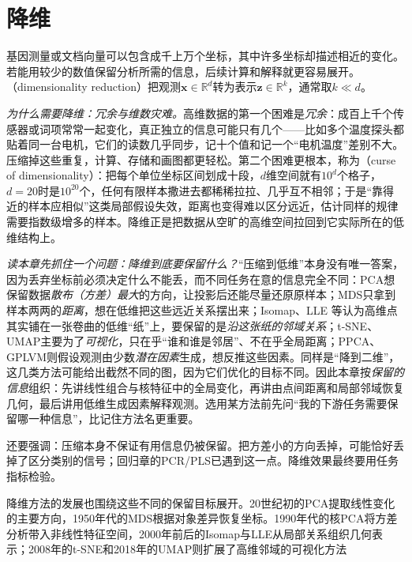 \chapter{降维}
\label{chap:dimensionality-reduction}

\begingroup
\let\dimensionalityNoteFont\booknotefont
\renewcommand{\booknotefont}{\dimensionalityNoteFont\color{black}}

基因测量或文档向量可以包含成千上万个坐标，其中许多坐标却描述相近的变化。若能用较少的数值保留分析所需的信息，后续计算和解释就更容易展开。（dimensionality reduction）把观测$\bm{x}\in\mathbb{R}^{d}$转为表示$\bm{z}\in\mathbb{R}^{k}$，通常取$k\ll d$。

\emph{为什么需要降维：冗余与维数灾难。}高维数据的第一个困难是\emph{冗余}：成百上千个传感器或词项常常一起变化，真正独立的信息可能只有几个——比如多个温度探头都贴着同一台电机，它们的读数几乎同步，记十个值和记一个“电机温度”差别不大。压缩掉这些重复，计算、存储和画图都更轻松。第二个困难更根本，称为（curse of dimensionality）：把每个单位坐标区间划成十段，$d$维空间就有$10^d$个格子，$d=20$时是$10^{20}$个，任何有限样本撒进去都稀稀拉拉、几乎互不相邻；于是“靠得近的样本应相似”这类局部假设失效，距离也变得难以区分远近，估计同样的规律需要指数级增多的样本。降维正是把数据从空旷的高维空间拉回到它实际所在的低维结构上。

\emph{读本章先抓住一个问题：降维到底要保留什么？}“压缩到低维”本身没有唯一答案，因为丢弃坐标前必须决定什么不能丢，而不同任务在意的信息完全不同：PCA想保留数据\emph{散布（方差）最大}的方向，让投影后还能尽量还原原样本；MDS只拿到样本两两的\emph{距离}，想在低维把这些远近关系摆出来；Isomap、LLE 等认为高维点其实铺在一张卷曲的低维“纸”上，要保留的是\emph{沿这张纸的邻域关系}；t-SNE、UMAP主要为了\emph{可视化}，只在乎“谁和谁是邻居”、不在乎全局距离；PPCA、GPLVM则假设观测由少数\emph{潜在因素}生成，想反推这些因素。同样是“降到二维”，这几类方法可能给出截然不同的图，因为它们优化的目标不同。因此本章按\emph{保留的信息}组织：先讲线性组合与核特征中的全局变化，再讲由点间距离和局部邻域恢复几何，最后讲用低维生成因素解释观测。选用某方法前先问“我的下游任务需要保留哪一种信息”，比记住方法名更重要。

还要强调：压缩本身不保证有用信息仍被保留。把方差小的方向丢掉，可能恰好丢掉了区分类别的信号；回归章的PCR/PLS已遇到这一点。降维效果最终要用任务指标检验。

降维方法的发展也围绕这些不同的保留目标展开。20世纪初的PCA提取线性变化的主要方向，1950年代的MDS根据对象差异恢复坐标。1990年代的核PCA将方差分析带入非线性特征空间，2000年前后的Isomap与LLE从局部关系组织几何表示；2008年的t-SNE和2018年的UMAP则扩展了高维邻域的可视化方法

